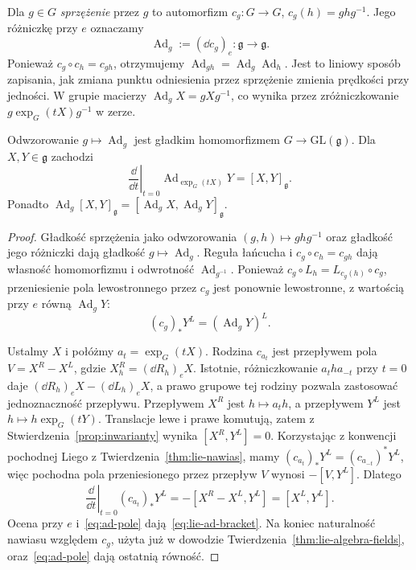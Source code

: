 \begin{definicja}
\label{def:lie-ad}
Dla $g\in G$ \emph{sprzężenie} przez $g$ to automorfizm
$c_g:G\to G$, $c_g(h)=ghg^{-1}$. Jego różniczkę przy $e$
oznaczamy
\[
 \operatorname{Ad}_g:=(\dd c_g)_e:
 \mathfrak g\longrightarrow\mathfrak g.
\]
Ponieważ $c_g\circ c_h=c_{gh}$, otrzymujemy
$\operatorname{Ad}_{gh}=\operatorname{Ad}_g\operatorname{Ad}_h$.
Jest to liniowy sposób zapisania, jak zmiana punktu odniesienia
przez sprzężenie zmienia prędkości przy jedności.
W grupie macierzy $\operatorname{Ad}_gX=gXg^{-1}$,
co wynika przez zróżniczkowanie
$g\exp_G(tX)g^{-1}$ w zerze.
\end{definicja}

\begin{twierdzenie}
\label{thm:lie-ad-bracket}
Odwzorowanie $g\mapsto\operatorname{Ad}_g$ jest gładkim
homomorfizmem $G\to\mathrm{GL}(\mathfrak g)$.
Dla $X,Y\in\mathfrak g$ zachodzi
\begin{equation}\label{eq:lie-ad-bracket}
 \left.\frac{\dd}{\dd t}\right|_{t=0}
 \operatorname{Ad}_{\exp_G(tX)}Y=[X,Y]_{\mathfrak g}.
\end{equation}
Ponadto $\operatorname{Ad}_g[X,Y]_{\mathfrak g}
=[\operatorname{Ad}_gX,\operatorname{Ad}_gY]_{\mathfrak g}$.
\end{twierdzenie}
\begin{proof}
Gładkość sprzężenia jako odwzorowania $(g,h)\mapsto ghg^{-1}$
oraz gładkość jego różniczki dają gładkość $g\mapsto
\operatorname{Ad}_g$. Reguła łańcucha i
$c_g\circ c_h=c_{gh}$ dają własność homomorfizmu
i odwrotność $\operatorname{Ad}_{g^{-1}}$.
Ponieważ $c_g\circ L_h=L_{c_g(h)}\circ c_g$,
przeniesienie pola lewostronnego przez $c_g$ jest
ponownie lewostronne, z wartością przy $e$ równą
$\operatorname{Ad}_gY$:
\begin{equation}\label{eq:ad-pole}
 (c_g)_*Y^L=(\operatorname{Ad}_gY)^L.
\end{equation}

Ustalmy $X$ i połóżmy $a_t=\exp_G(tX)$.
Rodzina $c_{a_t}$ jest przepływem pola
$V=X^R-X^L$, gdzie $X^R_h=(\dd R_h)_eX$.
Istotnie, różniczkowanie $a_t h a_{-t}$ przy $t=0$
daje $(\dd R_h)_eX-(\dd L_h)_eX$, a prawo grupowe
tej rodziny pozwala zastosować jednoznaczność przepływu.
Przepływem $X^R$ jest $h\mapsto a_t h$, a przepływem
$Y^L$ jest $h\mapsto h\exp_G(tY)$. Translacje lewe
i prawe komutują, zatem z
Stwierdzenia~\ref{prop:inwarianty} wynika
$[X^R,Y^L]=0$. Korzystając z konwencji pochodnej
Liego z Twierdzenia~\ref{thm:lie-nawias}, mamy
$(c_{a_t})_*Y^L=(c_{a_{-t}})^*Y^L$,
więc pochodna pola przeniesionego przez przepływ $V$
wynosi $-[V,Y^L]$. Dlatego
\[
 \left.\frac{\dd}{\dd t}\right|_{t=0}
 (c_{a_t})_*Y^L
 =-[X^R-X^L,Y^L]=[X^L,Y^L].
\]
Ocena przy $e$ i~\eqref{eq:ad-pole} dają~\eqref{eq:lie-ad-bracket}.
Na koniec naturalność nawiasu względem $c_g$,
użyta już w dowodzie Twierdzenia~\ref{thm:lie-algebra-fields},
oraz~\eqref{eq:ad-pole} dają ostatnią równość.
\end{proof}

